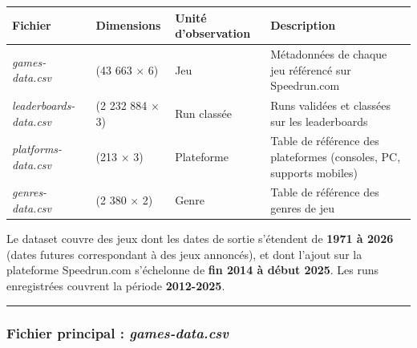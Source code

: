 \documentclass[
]{article}
\begin{document}
\begin{longtable}[]{@{}
  >{\raggedright\arraybackslash}p{}
  >{\raggedright\arraybackslash}p{}
  >{\raggedright\arraybackslash}p{}
  >{\raggedright\arraybackslash}p{}@{}}
\toprule\noalign{}
\begin{minipage}[b]{\linewidth}\raggedright
Fichier
\end{minipage} & \begin{minipage}[b]{\linewidth}\raggedright
Dimensions
\end{minipage} & \begin{minipage}[b]{\linewidth}\raggedright
Unité d'observation
\end{minipage} & \begin{minipage}[b]{\linewidth}\raggedright
Description
\end{minipage} \\
\midrule\noalign{}
\endhead
\bottomrule\noalign{}
\endlastfoot
\emph{games-data.csv} & (43 663 × 6) & Jeu & Métadonnées de chaque jeu
référencé sur Speedrun.com \\
\emph{leaderboards-data.csv} & (2 232 884 × 3) & Run classée & Runs
validées et classées sur les leaderboards \\
\emph{platforms-data.csv} & (213 × 3) & Plateforme & Table de référence
des plateformes (consoles, PC, supports mobiles) \\
\emph{genres-data.csv} & (2 380 × 2) & Genre & Table de référence des
genres de jeu \\
\end{longtable}

Le dataset couvre des jeux dont les dates de sortie s'étendent de
\textbf{1971 à 2026} (dates futures correspondant à des jeux annoncés),
et dont l'ajout sur la plateforme Speedrun.com s'échelonne de
\textbf{fin 2014 à début 2025}. Les runs enregistrées couvrent la
période \textbf{2012-2025}.

\begin{center}\rule{0.5\linewidth}{0.5pt}\end{center}

\subsubsection{\texorpdfstring{Fichier principal :
\emph{games-data.csv}}{Fichier principal : games-data.csv}}\label{fichier-principal-games-data.csv}
\end{document}
